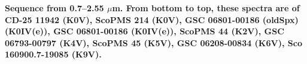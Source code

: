 {\bf Sequence from 0.7–2.55 $\mu$m. From bottom to top, these spectra are of CD-25 11942 (K0V), ScoPMS 214 (K0V), GSC 06801-00186 (oldSpx) (K0IV(e)), GSC 06801-00186 (K0IV(e)), ScoPMS 44 (K2V), GSC 06793-00797 (K4V), ScoPMS 45 (K5V), GSC 06208-00834 (K6V), Sco 160900.7-19085 (K9V).
\label{fig:stack-plot-k}}
